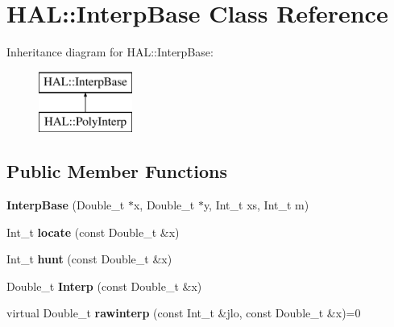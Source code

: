 \hypertarget{class_h_a_l_1_1_interp_base}{\section{H\+A\+L\+:\+:Interp\+Base Class Reference}
\label{class_h_a_l_1_1_interp_base}
}
Inheritance diagram for H\+A\+L\+:\+:Interp\+Base\+:\begin{figure}[H]
\begin{center}
\leavevmode
\includegraphics[height=2.000000cm]{class_h_a_l_1_1_interp_base}
\end{center}
\end{figure}
\subsection*{Public Member Functions}
\begin{DoxyCompactItemize}
\item 
\hypertarget{class_h_a_l_1_1_interp_base_a7da5f00617f93f337e983e48faa339d7}{{\bfseries Interp\+Base} (Double\+\_\+t $\ast$x, Double\+\_\+t $\ast$y, Int\+\_\+t xs, Int\+\_\+t m)}\label{class_h_a_l_1_1_interp_base_a7da5f00617f93f337e983e48faa339d7}

\item 
\hypertarget{class_h_a_l_1_1_interp_base_a54d32cf70679d2eb8d1a39a0bd242b39}{Int\+\_\+t {\bfseries locate} (const Double\+\_\+t \&x)}\label{class_h_a_l_1_1_interp_base_a54d32cf70679d2eb8d1a39a0bd242b39}

\item 
\hypertarget{class_h_a_l_1_1_interp_base_ad1bccffef0b532774150b419dbdff5b3}{Int\+\_\+t {\bfseries hunt} (const Double\+\_\+t \&x)}\label{class_h_a_l_1_1_interp_base_ad1bccffef0b532774150b419dbdff5b3}

\item 
\hypertarget{class_h_a_l_1_1_interp_base_a7d86cc16a9c8ba0bf24e8137f9eb21b3}{Double\+\_\+t {\bfseries Interp} (const Double\+\_\+t \&x)}\label{class_h_a_l_1_1_interp_base_a7d86cc16a9c8ba0bf24e8137f9eb21b3}

\item 
\hypertarget{class_h_a_l_1_1_interp_base_a524cc9b36f0e36c8f69f5c77bc68de7b}{virtual Double\+\_\+t {\bfseries rawinterp} (const Int\+\_\+t \&jlo, const Double\+\_\+t \&x)=0}\label{class_h_a_l_1_1_interp_base_a524cc9b36f0e36c8f69f5c77bc68de7b}

\end{DoxyCompactItemize}
